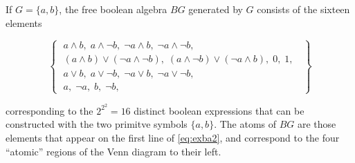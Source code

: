 \documentclass{article}
\theoremstyle{plain}
\theoremstyle{definition}
\theoremstyle{remark}
\begin{document}
	\begin{example}
		If $G = \{a, b\}$, the free boolean algebra $BG$ generated by $G$ consists of the sixteen elements 
		
		\medskip
		\begin{minipage}{0.3\textwidth}
			\begin{center}%
				\label{fig:ven2BA}
			\end{center}
		\end{minipage}\begin{minipage}{0.65\textwidth}
			\begin{equation} \left\{\;
				\begin{aligned}
					a \land b,\; a \land \lnot b,\; \lnot a \land b,\; \lnot a \land \lnot b,\; \\
					(a\land b) \lor(\lnot a \land \lnot b),\; (a\land \lnot b) \lor (\lnot a \land b),\; 0,\; 1,\;\\
					a \lor b,\; a \lor \lnot b,\;  \lnot a \lor b,\; \lnot a \lor \lnot b,\; \\
					a,\; \lnot a,\; b,\; \lnot b,\;
				\end{aligned}\;
				\right\} \label{eq:exba2} \end{equation}
		\end{minipage}
		\par\smallskip\noindent
		corresponding to the $2^{2^2} = 16$ distinct boolean expressions that can be constructed with the two primitve symbols $\{a, b\}$. The atoms of $BG$ are those elements that appear on the first line of \eqref{eq:exba2}, and correspond to the four ``atomic'' regions of the Venn diagram to their left.
	\end{example}
	
\end{document}
